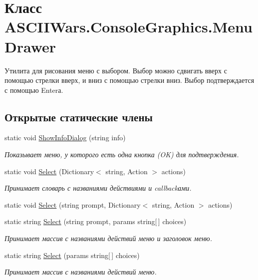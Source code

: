 \hypertarget{class_a_s_c_i_i_wars_1_1_console_graphics_1_1_menu_drawer}{}\section{Класс A\+S\+C\+I\+I\+Wars.\+Console\+Graphics.\+Menu\+Drawer}
\label{class_a_s_c_i_i_wars_1_1_console_graphics_1_1_menu_drawer}


Утилита для рисования меню с выбором. Выбор можно сдвигать вверх с помощью стрелки вверх, и вниз с помощью стрелки вниз. Выбор подтверждается с помощью Enter\textquotesingle{}а.  


\subsection*{Открытые статические члены}
\begin{DoxyCompactItemize}
\item 
static void \hyperlink{class_a_s_c_i_i_wars_1_1_console_graphics_1_1_menu_drawer_a48cc3b43302cba89239d72c3f6bcddab}{Show\+Info\+Dialog} (string info)
\begin{DoxyCompactList}\small\item\em Показывает меню, у которого есть одна кнопка ({\ttfamily OK}) для подтверждения. \end{DoxyCompactList}\item 
static void \hyperlink{class_a_s_c_i_i_wars_1_1_console_graphics_1_1_menu_drawer_a2c8b1f60df7a915364bc4c0244599aa1}{Select} (Dictionary$<$ string, Action $>$ actions)
\begin{DoxyCompactList}\small\item\em Принимает словарь с названиями действиями и callback\textquotesingle{}ами. \end{DoxyCompactList}\item 
static void \hyperlink{class_a_s_c_i_i_wars_1_1_console_graphics_1_1_menu_drawer_a5870384104321c1a9e954514ebd11b3a}{Select} (string prompt, Dictionary$<$ string, Action $>$ actions)
\item 
static string \hyperlink{class_a_s_c_i_i_wars_1_1_console_graphics_1_1_menu_drawer_a119f33600258dbcc040ca77f06d6c7ac}{Select} (string prompt, params string\mbox{[}$\,$\mbox{]} choices)
\begin{DoxyCompactList}\small\item\em Принимает массив с названиями действий меню и заголовок меню. \end{DoxyCompactList}\item 
static string \hyperlink{class_a_s_c_i_i_wars_1_1_console_graphics_1_1_menu_drawer_aab8b9a476227de6b8d81cb87747bdc99}{Select} (params string\mbox{[}$\,$\mbox{]} choices)
\begin{DoxyCompactList}\small\item\em Принимает массив с названиями действий меню. \end{DoxyCompactList}\end{DoxyCompactItemize}


